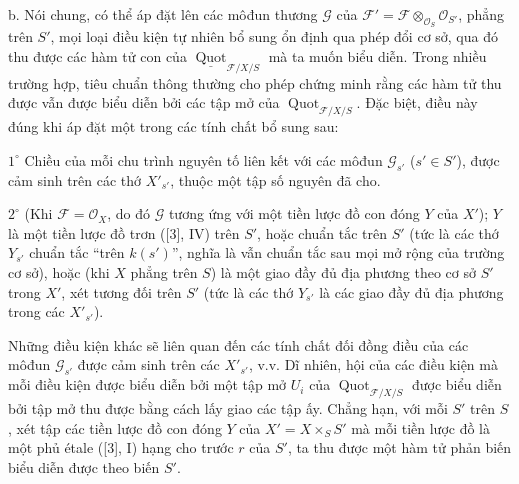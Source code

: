 \documentclass[11pt,twoside,openany]{book}
\numberwithin{equation}{section}
\begin{document}
\medskip
\noindent b. Nói chung, có thể áp đặt lên các môđun thương $\mathcal G$ của
$\mathcal F'=\mathcal F\otimes_{\mathcal O_S}\mathcal O_{S'}$, phẳng trên
$S'$, mọi loại điều kiện tự nhiên bổ sung ổn định qua phép đổi cơ sở, qua đó thu
được các hàm tử con của
$\underline{\operatorname{Quot}}_{\mathcal F/X/S}$ mà ta muốn biểu diễn. Trong
nhiều trường hợp, tiêu chuẩn thông thường cho phép chứng minh rằng các hàm tử
thu được vẫn được biểu diễn bởi các tập mở của
$\operatorname{Quot}_{\mathcal F/X/S}$. Đặc biệt, điều này đúng khi áp đặt một
trong các tính chất bổ sung sau:

\smallskip
\noindent $1^\circ$ Chiều của mỗi chu trình nguyên tố liên kết với các môđun
$\mathcal G_{s'}$ ($s'\in S'$), được cảm sinh trên các thớ $X'_{s'}$, thuộc
một tập số nguyên đã cho.

\smallskip
\noindent $2^\circ$ (Khi $\mathcal F=\mathcal O_X$, do đó $\mathcal G$ tương
ứng với một tiền lược đồ con đóng $Y$ của $X'$); $Y$ là một tiền lược đồ trơn
([3], IV) trên $S'$, hoặc chuẩn tắc trên $S'$ (tức là các thớ $Y_{s'}$ chuẩn
tắc ``trên $k(s')$'', nghĩa là vẫn chuẩn tắc sau mọi mở rộng của trường cơ
sở), hoặc (khi $X$ phẳng trên $S$) là một giao đầy đủ địa phương theo cơ sở
$S'$ trong $X'$, xét tương đối trên $S'$ (tức là các thớ $Y_{s'}$ là các giao
đầy đủ địa phương trong các $X'_{s'}$).

Những điều kiện khác sẽ liên quan đến các tính chất đối đồng điều
của các môđun $\mathcal G_{s'}$ được cảm sinh trên các $X'_{s'}$, v.v. Dĩ
nhiên, hội của các điều kiện mà mỗi điều kiện được biểu diễn bởi một tập mở
$U_i$ của $\operatorname{Quot}_{\mathcal F/X/S}$ được biểu diễn bởi tập mở thu
được bằng cách lấy giao các tập ấy. Chẳng hạn, với mỗi $S'$ trên $S$, xét tập
các tiền lược đồ con đóng $Y$ của $X'=X\times_SS'$ mà mỗi tiền lược đồ là một
phủ étale ([3], I) hạng cho trước $r$ của $S'$, ta thu được một hàm tử phản biến
biểu diễn được theo biến $S'$.
\end{document}
